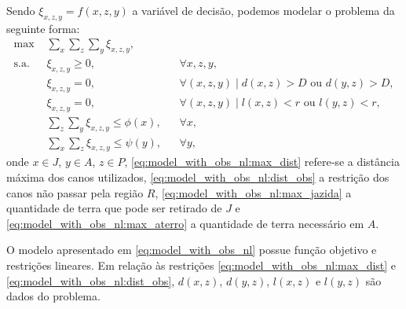 Sendo $\xi_{x, z, y} = f(x, z, y)$ a variável de decisão, podemos modelar o
problema da seguinte forma:
\begin{subequations}
    \begin{align}
        \text{max } & \sum_{x} \sum_{z} \sum_{y} \xi_{x, z, y},
        \label{eq:model_with_obs_nl:obj_func} \\
        \text{s.a. } & \xi_{x, z, y} \geq 0, && \forall x, z, y,
        \label{eq:model_with_obs_nl:var} \\
        & \xi_{x, z, y} = 0, && \forall (x, z, y) \mid d(x, z) > D \text{ ou } 
        d(y, z) > D,
        \label{eq:model_with_obs_nl:max_dist} \\
        & \xi_{x, z, y} = 0, && \forall (x, z, y) \mid l(x, z) < r \text{ ou }
        l(y, z) < r,
        \label{eq:model_with_obs_nl:dist_obs} \\
        & \sum_{z} \sum_{y} \xi_{x, z, y} \leq \phi(x), && \forall x,
        \label{eq:model_with_obs_nl:max_jazida} \\
        & \sum_{x} \sum_{z} \xi_{x, z, y} \leq \psi(y), && \forall y,
        \label{eq:model_with_obs_nl:max_aterro}
    \end{align}
    \label{eq:model_with_obs_nl}
\end{subequations}
onde $x \in J$, $y \in A$, $z \in P$, \eqref{eq:model_with_obs_nl:max_dist}
refere-se a distância máxima dos canos utilizados,
\eqref{eq:model_with_obs_nl:dist_obs} a restrição dos canos não passar pela
região $R$, \eqref{eq:model_with_obs_nl:max_jazida} a quantidade de terra que pode
ser retirado de $J$ e \eqref{eq:model_with_obs_nl:max_aterro} a quantidade de terra
necessário em $A$.

O modelo apresentado em \eqref{eq:model_with_obs_nl} possue função objetivo e
restrições lineares. Em relação \`{a}s restrições
\eqref{eq:model_with_obs_nl:max_dist} e \eqref{eq:model_with_obs_nl:dist_obs},
$d(x, z)$, $d(y, z)$, $l(x, z)$ e $l(y, z)$ são dados do problema.

